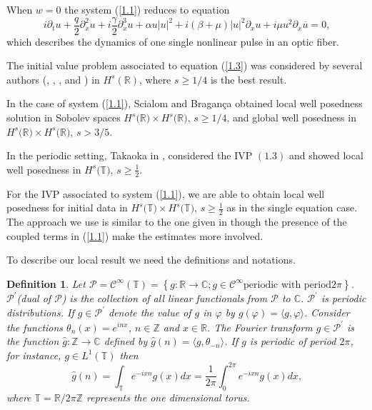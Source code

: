 \documentclass[reqno]{amsart}
\newtheorem{definition}[theorem]{Definition}
\numberwithin{equation}{section}
\begin{document}
When $w=0$ the system (\ref{1.1}) reduces to equation
\begin{equation}\label{1.3}
i\partial_{t}u+\frac{q}{2}\partial_{x}^{2}u+i\frac{\gamma}{2}\partial_{x}^{3}u+\alpha u| u| ^{2}+i\left(
\beta+\mu\right) | u| ^{2}\partial_{x}u+i\mu
u^{2}\partial_{x}\overline
{u}=0\text{,}
\end{equation}
which describes the dynamics of one single nonlinear pulse in an
optic fiber.

The initial value problem associated to equation  (\ref{1.3}) was
considered by several authors (\cite{26}, \cite{35}, \cite{6},
\cite{7} and \cite{8}) in $H^{s}(\mathbb{R})$, where $ s\geq 1/4$
is the best result.

In the case of system (\ref{1.1}), Scialom and Bragan\c{c}a
\cite{4a} obtained local well posedness solution in Sobolev spaces
$H^{s}(\mathbb{R)\times }H^{s}(\mathbb{R)}$, $ s\geq 1/4$, and
global well posedness in $H^{s}(\mathbb{R)\times
}H^{s}(\mathbb{R)}$,  $s > 3/5$.

In the periodic setting, Takaoka in \cite{38}, considered the
IVP $(1.3)$ and showed local well posedness in
$H^{s}(\mathbb{T)}$, $s\geq \frac{1}{2}$.

For the IVP associated to system (\ref{1.1}), we are able to
obtain local well posedness for initial data in
$H^{s}(\mathbb{T)\times} H^{s}(\mathbb{T)}$, $s\geq \frac{1}{2}$
as in the single equation case. The approach we use is similar to
the one given in \cite{38} though the presence of the coupled
terms in (\ref{1.1}) make the estimates more involved.

To describe our local result we need the definitions and
notations.

\begin{definition}
Let $\mathcal{P}=\mathcal{C}^{\infty}\left(  \mathbb{T}\right)
=\left\{ g:\mathbb{R}\rightarrow\mathbb{C};\text{
}g\in\mathcal{C}^{\infty}\text{periodic with period} 2\pi\right\}
$. $\mathcal{P}^{\prime}$(dual of $\mathcal{P}$) is the collection
of all linear functionals  from $\mathcal{P}$ to $\mathbb{C}$.
$\mathcal{P}^{\prime}$ is periodic distributions. If
$g\in\mathcal{P}^{\prime}$ denote the value of  $g$ in $\varphi$
by $g\left( \varphi\right) =\langle g,\varphi\rangle$. Consider
the functions  $\theta_{n}\left( x\right) =e^{inx}$,
$n\in\mathbb{Z}$ and $x\in\mathbb{R}$. The Fourier transform
$g\in\mathcal{P}^{\prime}$ is the function
$\widehat{g}:\mathbb{Z}\rightarrow\mathbb{C}$ defined by
$\widehat{g}\left( n\right)  =\langle g,\theta_{-n}\rangle$. If
$g$ is periodic of period $2\pi$, for instance, $g\in L^{1}\left(
\mathbb{T}\right)  $ then
\[
\widehat{g}(n)=\int_{\mathbb{T}}e^{-ixn}g(x)dx=\frac{1}{2\pi}\int
\nolimits_{0}^{2\pi}e^{-ixn}g(x)dx\text{,}\]
where $\mathbb{T=R}/2\pi\mathbb{Z}$ represents the one dimensional
torus.
\end{definition}
\end{document}
